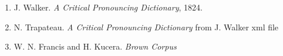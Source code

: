 \begin{enumerate}
\item J. Walker. \textit{A Critical Pronouncing Dictionary}, 1824.

\item N. Trapateau. \textit{A Critical Pronouncing Dictionary} from J. Walker xml file

\item W. N. Francis and H. Kucera. \textit{Brown Corpus}
\end{enumerate}